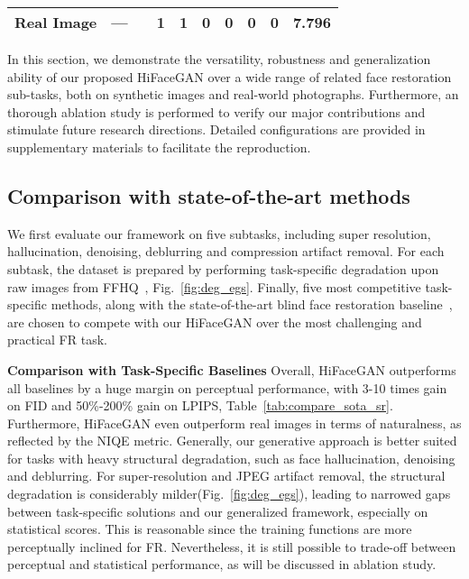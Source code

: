 \documentclass[sigconf]{acmart}
\begin{document}
\begin{table*}[!pt]
{\begin{tabular}{|c|c|ccc|cc|ccc|}
       \textbf{Real Image} & --- &  & 1 & 1 & 0 & 0& 0 & 0 & 7.796 \\
       \hline

	\end{tabular}
	}
\end{table*}

In this section, we demonstrate the versatility, robustness and generalization ability of our proposed HiFaceGAN over a wide range of related face restoration sub-tasks, both on synthetic images and real-world photographs. Furthermore, an thorough ablation study is performed to verify our major contributions and stimulate future research directions. Detailed configurations are provided in supplementary materials to facilitate the reproduction.

\subsection{Comparison with state-of-the-art methods}\label{sec:sota}
We first evaluate our framework on five subtasks, including super resolution, hallucination, denoising, deblurring and compression artifact removal. For each subtask, the dataset is prepared by performing task-specific degradation upon raw images from FFHQ~\cite{stylegan_ffhq}, Fig.~\ref{fig:deg_egs}. Finally, five most competitive task-specific methods, along with the state-of-the-art blind face restoration baseline~\cite{BlindFR-ECCV2018}, are chosen to compete with our HiFaceGAN over the most challenging and practical FR task.

\textbf{Comparison with Task-Specific Baselines}
Overall, HiFaceGAN outperforms all baselines by a huge margin on perceptual performance, with 3-10 times gain on FID and 50\%-200\% gain on LPIPS, Table~\ref{tab:compare_sota_sr}. Furthermore, HiFaceGAN even outperform real images in terms of naturalness, as reflected by the NIQE metric. Generally, our generative approach is better suited for tasks with heavy structural degradation, such as face hallucination, denoising and deblurring. For super-resolution and JPEG artifact removal, the structural degradation is considerably milder(Fig.~\ref{fig:deg_egs}), leading to narrowed gaps between task-specific solutions and our generalized framework, especially on statistical scores. This is reasonable since the training functions are more perceptually inclined for FR. Nevertheless, it is still possible to trade-off between perceptual and statistical performance, as will be discussed in ablation study.
\end{document}
